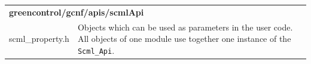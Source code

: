

\noindent
\begin{minipage}{\textwidth}
\begin{tabularx}{\textwidth}{|l|X|}
	\cline{1-1}\cline{2-2}\multicolumn{2}{|l|}{  {\bf\sffamily greencontrol/gcnf/apis/scmlApi}    }\\
	\cline{1-1}\cline{2-2} scml\_property.h    &  Objects which can be used as parameters in the user code. All objects of one module use together one instance of the \lstinline|Scml_Api|.    \\
	\hline
\end{tabularx}
\end{minipage}

